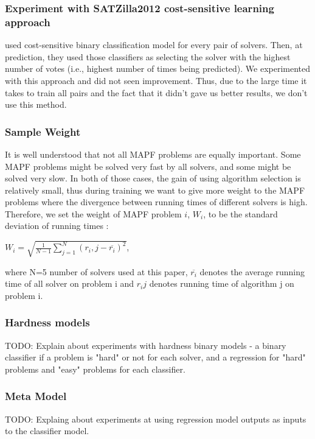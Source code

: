 \documentclass[letterpaper]{article} %
\begin{document}
\subsubsection{Experiment with SATZilla2012 cost-sensitive learning approach}
\cite{xu2012satzilla2012} used cost-sensitive binary classification model for every pair of solvers. Then, at prediction, they used those classifiers as selecting the solver with the highest number of votes (i.e., highest number of times being predicted). We experimented with this approach and did not seen improvement. Thus, due to the large time it takes to train all pairs and the fact that it didn't gave us better results, we don't use this method.

\subsubsection{Sample Weight}
It is well understood that not all MAPF problems are equally important. Some MAPF problems might be solved very fast by all solvers, and some might be solved very slow. In both of those cases, the gain of using algorithm selection is relatively small, thus during training we want to give more weight to the MAPF problems where the divergence between running times of different solvers is high. Therefore, we set the weight of MAPF problem $i$, $W_i$, to be the standard deviation of running times :

$W_i =  \sqrt{\frac{1}{N-1} \sum_{j=1}^N (r_i,j - \overline{r_i})^2}$, 

where N=5 number of solvers used at this paper, $\overline{r_i}$ denotes the average running time of all solver on problem i and $r_ij$ denotes running time of algorithm j on problem i.


\subsubsection{Hardness models}
TODO: Explain about experiments with hardness binary models - a binary classifier if a problem is "hard" or not for each solver, and a regression for "hard" problems and "easy" problems for each classifier.

\subsubsection{Meta Model}
TODO: Explaing about experiments at using regression model outputs as inputs to the classifier model.
\end{document}
